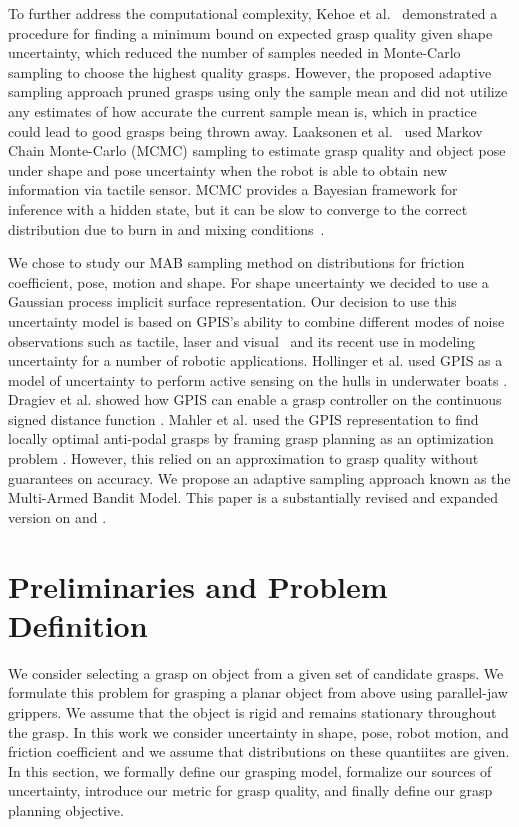 \documentclass[journal,transmag]{IEEEtran}%
\begin{document}
To further address the computational complexity, Kehoe et al.~\cite{kehoe2012estimating} demonstrated a procedure for finding a minimum bound on expected grasp quality given shape uncertainty, which reduced the number of samples needed in Monte-Carlo sampling to choose the highest quality grasps. However, the proposed adaptive sampling approach pruned grasps using only the sample mean and did not utilize any estimates of how accurate the current sample mean is, which in practice could lead to good grasps being thrown away.
Laaksonen et al.~\cite{laaksonen2012probabilistic} used Markov Chain Monte-Carlo (MCMC) sampling to estimate grasp quality and object pose  under shape and pose uncertainty when the robot is able to obtain new information via tactile sensor.
MCMC provides a Bayesian framework for inference with a hidden state, but it can be slow to converge to the correct distribution due to burn in and mixing conditions~\cite{andrieu2003introduction}.

We chose to study our MAB sampling method on distributions for friction coefficient, pose, motion and shape. For shape uncertainty we decided to use a Gaussian process implicit surface representation. Our decision to use this uncertainty model is based on GPIS's ability to combine different modes of noise observations such as tactile, laser and visual~\cite{rasmussen2006, williams2007, dragiev2011} and its recent use in modeling uncertainty for a number of robotic applications.
Hollinger et al. used GPIS as a model of uncertainty to perform active sensing on the hulls in underwater boats \cite{hollinger2013}.
Dragiev et al. showed how GPIS can enable a grasp controller on the continuous signed distance function \cite{dragiev2011}.
Mahler et al. used the GPIS representation to find locally optimal anti-podal grasps by framing grasp planning as an optimization problem \cite{mahler2015gp}.  However, this relied on an approximation to grasp quality without guarantees on accuracy. We propose an adaptive sampling approach known as the Multi-Armed Bandit Model. This paper is a substantially revised and expanded version on \cite{laskey} and \cite{mahler2015gp}.




\section{Preliminaries and Problem Definition}
We consider selecting a grasp on object from a given set of candidate grasps.
We formulate this problem for grasping a planar object from above using parallel-jaw grippers.
We assume that the object is rigid and remains stationary throughout the grasp.
In this work we consider uncertainty in shape, pose, robot motion, and friction coefficient and we assume that distributions on these quantiites are given.
In this section, we formally define our grasping model, formalize our sources of uncertainty, introduce our metric for grasp quality, and finally define our grasp planning objective.
\end{document}
